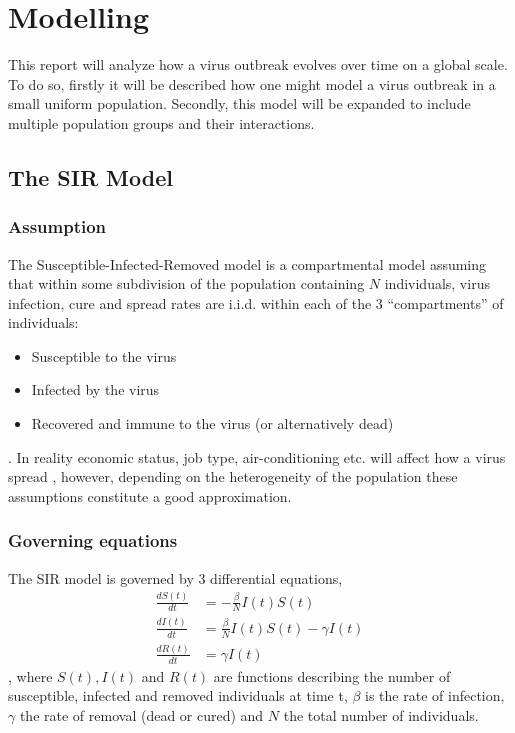 \section{Modelling}
This report will analyze how a virus outbreak evolves over time on a global scale. To do so, firstly it will be described how one might model a virus outbreak in a small uniform population. Secondly, this model will be expanded to include multiple population groups and their interactions.

\subsection{The SIR Model}
\subsubsection{Assumption}
The Susceptible-Infected-Removed model is a compartmental model assuming that within some subdivision of the population containing $N$ individuals, virus infection, cure and spread rates are i.i.d. within each of the 3 ``compartments'' of individuals:
\begin{itemize}
	\item Susceptible to the virus
	\item Infected by the virus
	\item Recovered and immune to the virus (or alternatively dead)
\end{itemize} 
. In reality economic status, job type, air-conditioning etc. will affect how a virus spread \cite{zika-modelling}, however, depending on the heterogeneity of the population these assumptions constitute a good approximation.

\subsubsection{Governing equations}
The SIR model is governed by 3 differential equations,
\begin{align}
\frac{d S(t)}{dt} &= - \frac{\beta}{N} I(t) S(t)   \label{eq-S}\\
\frac{d I(t)}{dt} &= \frac{\beta}{N} I(t) S(t) - \gamma I(t)  \label{eq-I}\\
\frac{d R(t)}{dt} &= \gamma I(t) \label{eq-R}
\end{align}
, where $S(t), I(t)$ and $R(t)$ are functions describing the number of susceptible, infected and removed individuals at time t, $\beta$ is the rate of infection, $\gamma$ the rate of removal (dead or cured) and $N$ the total number of individuals.

